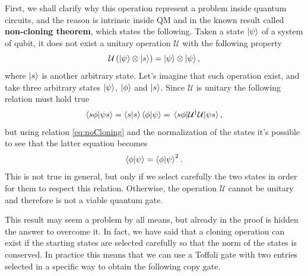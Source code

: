 First, we shall clarify why this operation represent a problem inside quantum circuits, and the reason is intrinsic inside QM and in the known result called \textbf{non-cloning theorem}, which states the following.
{
    \label{thm:cloning}
    Taken a state $\ket{\psi}$ of a system of qubit, it does not exist a unitary operation $\mathcal{U}$ with the following property
    \begin{equation}
        \label{eq:noCloning}
        \mathcal{U}\left( \ket{\psi}\otimes \ket{s} \right) = \ket{\psi}\otimes \ket{\psi},
    \end{equation}
    where $\ket{s}$ is another arbitrary state.
}
{
    Let's imagine that such operation exist, and take three arbitrary states $\ket{\psi}$, $\ket{\phi}$ and $\ket{s}$. Since $\mathcal{U}$ is unitary the following relation must hold true
    \begin{equation}
        \braket{s\phi}{\psi s} = \braket{s}\braket{\phi}{\psi} = \mel{s\phi}{\mathcal{U}^\dagger \mathcal{U}}{\psi s},
    \end{equation}
    but using relation \eqref{eq:noCloning} and the normalization of the states it's possible to see that the latter equation becomes
    \begin{equation}
        \braket{\phi}{\psi} = \braket{\phi}{\psi}^2.
    \end{equation}
    This is not true in general, but only if we select carefully the two states in order for them to respect this relation. Otherwise, the operation $\mathcal{U}$ cannot be unitary and therefore is not a viable quantum gate.
}

This result may seem a problem by all means, but already in the proof is hidden the answer to overcome it. In fact, we have said that a cloning operation can exist if the starting states are selected carefully so that the norm of the states is conserved. In practice this means that we can use a Toffoli gate with two entries selected in a specific way to obtain the following copy gate.

